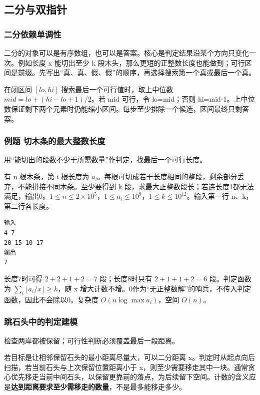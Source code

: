 \subsection{二分与双指针}
\subsubsection{二分依赖单调性}
二分的对象可以是有序数组，也可以是答案。核心是判定结果沿某个方向只变化一次。例如长度 x 能切出至少 k 段木头，那么更短的正整数长度也能做到；可行区间是前缀。先写出“真、真、假、假”的顺序，再选择搜索第一个真或最后一个真。

在闭区间 $[lo,hi]$ 搜索最后一个可行值时，取上中位数 $mid=lo+(hi-lo+1)/2$。若 mid 可行，令 lo=mid；否则 hi=mid-1。上中位数保证剩下两个元素时仍能缩小区间。每步至少排除一个候选，区间最终只剩答案。

\subsubsection{例题 切木条的最大整数长度}
用“能切出的段数不少于所需数量”作判定，找最后一个可行长度。

有 n 根木条，第 i 根长度为 $a_i$。每根可切成若干长度相同的整段，剩余部分丢弃，不能拼接不同木条。至少要得到 k 段，求最大正整数段长；若连长度1都无法满足，输出0。$1\le n\le2\times10^5$，$1\le a_i\le10^9$，$1\le k\le10^{12}$。输入第一行 n、k，第二行各长度。
\begin{verbatim}
输入
4 7
20 15 10 17
输出
7
\end{verbatim}
长度7时可得 $2+2+1+2=7$ 段；长度8时只有 $2+1+1+2=6$ 段。判定函数为 $\sum_i\lfloor a_i/x\rfloor\ge k$，随 x 增大计数不增。0作为“无正整数解”的哨兵，不传入判定函数，因此不会除以0。复杂度 $O(n\log\max a_i)$，空间 $O(n)$。

\subsubsection{跳石头中的判定建模}
检查两岸都被保留；可行性判断必须覆盖最后一段距离。

若目标是让相邻保留石头的最小距离尽量大，可以二分距离 x。判定时从起点向后扫描，若当前石头与上次保留位置距离小于 x，则至少需要移走其中一块。通常贪心优先移走当前中间石头，以保留更靠前的落点，为后续留下空间。计数的含义应是\textbf{达到距离要求至少需移走的数量}，不是最多能移走多少。

